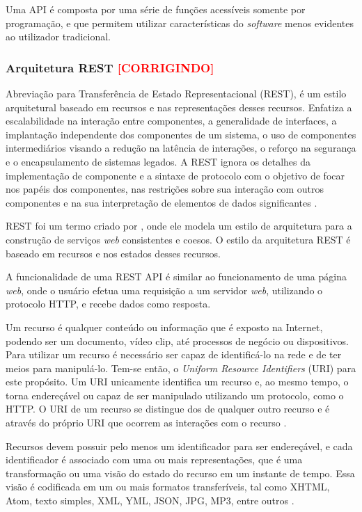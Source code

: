 Uma API é composta por uma série de funções acessíveis somente por programação, e que permitem utilizar características do \textit{software} menos evidentes ao utilizador tradicional.


\subsubsection{Arquitetura REST \textbf{\textcolor{red}{[CORRIGINDO]}}}
Abreviação para Transferência de Estado Representacional (REST), é um estilo arquitetural baseado em recursos e nas representações desses recursos. Enfatiza a escalabilidade na interação entre componentes, a generalidade de interfaces, a implantação independente dos componentes de um sistema, o uso de componentes intermediários visando a redução na latência de interações, o reforço na segurança e o encapsulamento de sistemas legados. A REST ignora os detalhes da implementação de componente e a sintaxe de protocolo com o objetivo de focar nos papéis dos componentes, nas restrições sobre sua interação com outros componentes e na sua interpretação de elementos de dados significantes \cite{rest}.

REST foi um termo criado por , onde ele modela um estilo de arquitetura para a construção de serviços \textit{web} consistentes e coesos. O estilo da arquitetura REST é baseado em recursos e nos estados desses recursos.

A funcionalidade de uma REST API é similar ao funcionamento de uma página \textit{web}, onde o usuário efetua uma requisição a um servidor \textit{web}, utilizando o protocolo HTTP, e recebe dados como resposta.

Um recurso é qualquer conteúdo ou informação que é exposto na Internet, podendo ser um documento, vídeo clip, até processos de negócio ou dispositivos. Para utilizar um recurso é necessário ser capaz de identificá-lo na rede e de ter meios para manipulá-lo. Tem-se então, o \textit{Uniform Resource Identifiers} (URI) para este propósito. Um URI unicamente identifica um recurso e, ao mesmo tempo, o torna endereçável ou capaz de ser manipulado utilizando um protocolo, como o HTTP. O URI de um recurso se distingue dos de qualquer outro recurso e é através do próprio URI que ocorrem as interações com o recurso \cite{rest-book}.

Recursos devem possuir pelo menos um identificador para ser endereçável, e cada identificador é associado com uma ou mais representações, que é uma transformação ou uma visão do estado do recurso em um instante de tempo. Essa visão é codificada em um ou mais formatos transferíveis, tal como XHTML, Atom, texto simples, XML, YML, JSON, JPG, MP3, entre outros  \cite{rest-book}.

